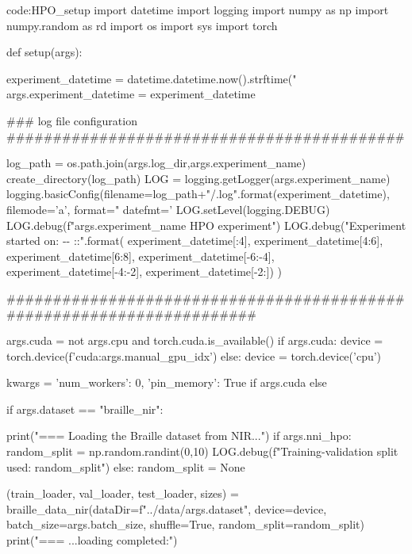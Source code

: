 \begin{mycodebox}{code:HPO_setup}
import datetime
import logging
import numpy as np
import numpy.random as rd
import os
import sys
import torch

def setup(args):

    experiment_datetime = datetime.datetime.now().strftime("%
    args.experiment_datetime = experiment_datetime

    ### log file configuration ###########################################

    log_path = os.path.join(args.log_dir,args.experiment_name)
    create_directory(log_path)
    LOG = logging.getLogger(args.experiment_name)
    logging.basicConfig(filename=log_path+"/{}.log".format(experiment_datetime),
                        filemode='a',
                        format="%
                        datefmt='%
    LOG.setLevel(logging.DEBUG)
    LOG.debug(f"{args.experiment_name} HPO experiment\n")
    LOG.debug("Experiment started on: {}-{}-{} {}:{}:{}\n".format(
        experiment_datetime[:4],
        experiment_datetime[4:6],
        experiment_datetime[6:8],
        experiment_datetime[-6:-4],
        experiment_datetime[-4:-2],
        experiment_datetime[-2:])
        )
    
    ######################################################################

    args.cuda = not args.cpu and torch.cuda.is_available()
    if args.cuda:
        device = torch.device(f'cuda:{args.manual_gpu_idx}')     
    else:
        device = torch.device('cpu')
    
    kwargs = {'num_workers': 0, 'pin_memory': True} if args.cuda else {}

    if args.dataset == "braille_nir":

        print("=== Loading the Braille dataset from NIR...")
        if args.nni_hpo:
            random_split = np.random.randint(0,10)
            LOG.debug(f"Training-validation split used: {random_split}")
        else:
            random_split = None

        (train_loader, val_loader, test_loader, sizes) = braille_data_nir(dataDir=f"../data/{args.dataset}", device=device, batch_size=args.batch_size, shuffle=True, random_split=random_split)
        print("=== ...loading completed:")


\end{mycodebox}
